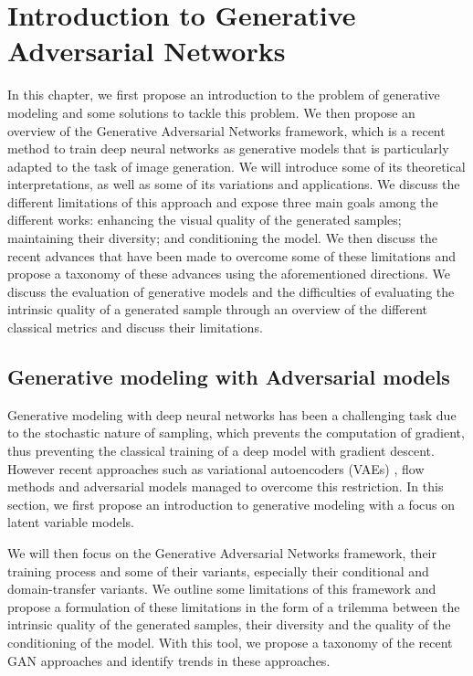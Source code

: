 \chapter{Introduction to Generative Adversarial Networks }
\label{chap:chapter1}

\begin{chapterabstract}
	In this chapter, we first propose an introduction to the problem of generative modeling and some solutions to tackle this problem. We then propose an overview of the Generative Adversarial Networks \citep{Goodfellow2014} framework, which is a recent method to train deep neural networks as generative models that is particularly adapted to the task of image generation. We will introduce some of its theoretical interpretations, as well as some of its variations and applications. We discuss the different limitations of this approach and expose three main goals among the different works: enhancing the visual quality of the generated samples; maintaining their diversity; and conditioning the model. We then discuss the recent advances that have been made to overcome some of these limitations and propose a taxonomy of these advances using the aforementioned directions. We discuss the evaluation of generative models and the difficulties of evaluating the intrinsic quality of a generated sample through an overview of the different classical metrics and discuss their limitations.
\end{chapterabstract}

\minitoc


\section{Generative modeling with Adversarial models}
Generative modeling with deep neural networks has been a challenging task due to the stochastic nature of sampling, which prevents the computation of gradient, thus preventing the classical training of a deep model with gradient descent. However recent approaches such as variational autoencoders (\ac{VAE}s) \citep{Kingma2014b}, flow methods \citep{Dinh2017, Kingma2018} and adversarial models \citep{Goodfellow2014} managed to overcome this restriction. In this section, we first propose an introduction to generative modeling with a focus on latent variable models.

We will then focus on the Generative Adversarial Networks \citep{Goodfellow2014} framework, their training process  and some of their variants, especially their conditional and domain-transfer variants. We outline some limitations of this framework and propose a formulation of these limitations in the form of a trilemma between the intrinsic quality of the generated samples, their diversity and the quality of the conditioning of the model. With this tool, we propose a taxonomy of the recent \ac{GAN} approaches and identify trends in these approaches.


